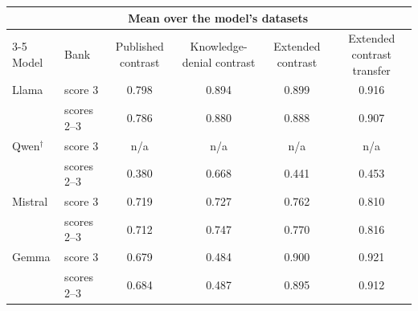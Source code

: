 \begin{tabular}{@{}ll cccc@{}}
\toprule
 & & \multicolumn{3}{c}{Mean over the model's datasets} & \\
\cmidrule(lr){3-5}
Model & Bank & Published contrast & Knowledge-denial contrast & Extended contrast & Extended contrast transfer \\
\midrule
Llama & score 3 & 0.798 & 0.894 & 0.899 & 0.916 \\
 & scores 2--3 & 0.786 & 0.880 & 0.888 & 0.907 \\
Qwen$^\dagger$ & score 3 & n/a & n/a & n/a & n/a \\
 & scores 2--3 & 0.380 & 0.668 & 0.441 & 0.453 \\
Mistral & score 3 & 0.719 & 0.727 & 0.762 & 0.810 \\
 & scores 2--3 & 0.712 & 0.747 & 0.770 & 0.816 \\
Gemma & score 3 & 0.679 & 0.484 & 0.900 & 0.921 \\
 & scores 2--3 & 0.684 & 0.487 & 0.895 & 0.912 \\
\bottomrule
\end{tabular}
